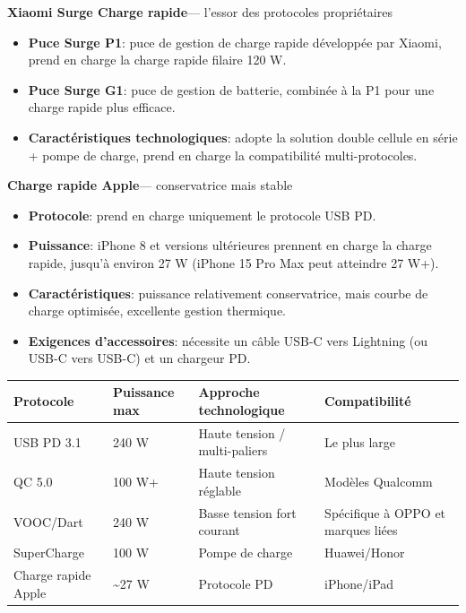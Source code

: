 \textbf{Xiaomi Surge Charge rapide}— l'essor des protocoles propriétaires

\begin{itemize}
  \item \textbf{Puce Surge P1}: puce de gestion de charge rapide développée par Xiaomi, prend en charge la charge rapide filaire 120 W.
  \item \textbf{Puce Surge G1}: puce de gestion de batterie, combinée à la P1 pour une charge rapide plus efficace.
  \item \textbf{Caractéristiques technologiques}: adopte la solution double cellule en série + pompe de charge, prend en charge la compatibilité multi-protocoles.
\end{itemize}

\textbf{Charge rapide Apple}— conservatrice mais stable

\begin{itemize}
  \item \textbf{Protocole}: prend en charge uniquement le protocole USB PD.
  \item \textbf{Puissance}: iPhone 8 et versions ultérieures prennent en charge la charge rapide, jusqu'à environ 27 W (iPhone 15 Pro Max peut atteindre 27 W+).
  \item \textbf{Caractéristiques}: puissance relativement conservatrice, mais courbe de charge optimisée, excellente gestion thermique.
  \item \textbf{Exigences d'accessoires}: nécessite un câble USB-C vers Lightning (ou USB-C vers USB-C) et un chargeur PD.
\end{itemize}


\begin{center}
\begin{tabularx}{\linewidth}{|X|X|X|X|}
\hline
\textbf{Protocole} & \textbf{Puissance max} & \textbf{Approche technologique} & \textbf{Compatibilité} \tabularnewline
\hline
USB PD 3.1 & 240 W & Haute tension / multi-paliers & Le plus large \tabularnewline
QC 5.0 & 100 W+ & Haute tension réglable & Modèles Qualcomm \tabularnewline
VOOC/Dart & 240 W & Basse tension fort courant & Spécifique à OPPO et marques liées \tabularnewline
SuperCharge & 100 W & Pompe de charge & Huawei/Honor \tabularnewline
Charge rapide Apple & \textasciitilde{}27 W & Protocole PD & iPhone/iPad \tabularnewline
\hline
\end{tabularx}
\end{center}

